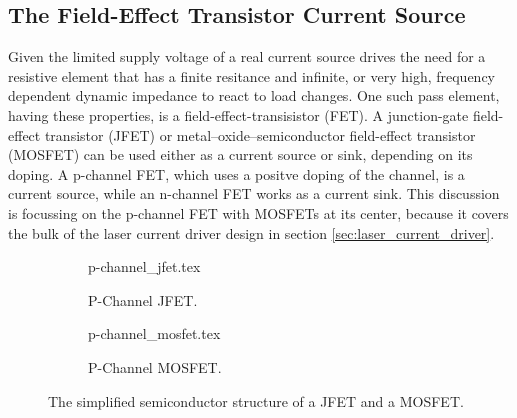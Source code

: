 \subsection{The Field-Effect Transistor Current Source}%
\label{sec:mosfet_current_source}
Given the limited supply voltage of a real current source drives the need for a resistive element that has a finite resitance and infinite, or very high, frequency dependent dynamic impedance to react to load changes. One such pass element, having these properties, is a field-effect-transisistor (FET). A junction-gate field-effect transistor (JFET) or metal–oxide–semiconductor field-effect transistor (MOSFET) can be used either as a current source or sink, depending on its doping. A p-channel FET, which uses a positve doping of the channel, is a current source, while an n-channel FET works as a current sink. This discussion is focussing on the p-channel FET with MOSFETs at its center, because it covers the bulk of the laser current driver design in section \ref{sec:laser_current_driver}.

\begin{figure}[hb]
    \centering
    \begin{subfigure}{0.4\linewidth}
        \centering
        {p-channel_jfet.tex}
        \caption{P-Channel JFET.}
        \label{fig:pjfet}
    \end{subfigure}
    \begin{subfigure}{0.4\linewidth}
        \centering
        {p-channel_mosfet.tex}
        \caption{P-Channel MOSFET.}
        \label{fig:pmos}
    \end{subfigure}
    \caption{The simplified semiconductor structure of a JFET and a MOSFET.}
    \label{fig:FETs}
\end{figure}


